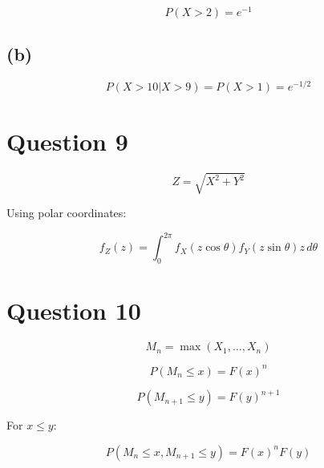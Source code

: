 \documentclass[12pt]{article}
\begin{document}
\[
P(X>2)=e^{-1}
\]

\subsection*{(b)}

\[
P(X>10|X>9)=P(X>1)=e^{-1/2}
\]

\section*{Question 9}

\[
Z=\sqrt{X^2+Y^2}
\]

Using polar coordinates:

\[
f_Z(z)
=
\int_0^{2\pi}
f_X(z\cos\theta)f_Y(z\sin\theta)
z\, d\theta
\]

\section*{Question 10}

\[
M_n=\max(X_1,\dots,X_n)
\]

\[
P(M_n \le x)=F(x)^n
\]

\[
P(M_{n+1} \le y)=F(y)^{n+1}
\]

For $x \le y$:

\[
P(M_n \le x, M_{n+1} \le y)
=
F(x)^n F(y)
\]
\end{document}
